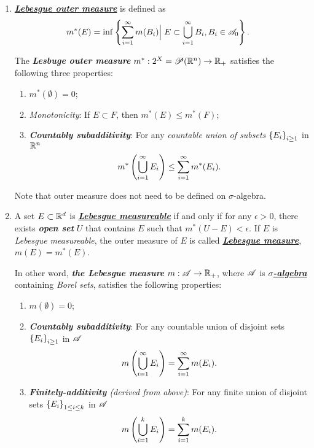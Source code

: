 \documentclass[11pt]{article}
\begin{document}
\begin{enumerate}
\item \underline{\emph{\textbf{Lebesgue outer measure}}} is defined as 
\begin{align*}
m^{*}(E) &= \inf\left\{ \sum_{i=1}^{\infty}m(B_{i})\Big|\;  E\subset \bigcup_{i=1}^{\infty}B_{i}, B_{i}\in {\mathscr A}_{0}\right\}.
\end{align*}

The \emph{\textbf{Lesbuge outer measure}} $m^{*}: 2^{X}={\mathscr P}({\mathbb R}^{n}) \rightarrow {\mathbb R}_{+}$ satisfies the following three properties:
\begin{enumerate}
\item $m^{*}(\emptyset) = 0$;
\item \emph{Monotonicity}: If $E\subset F$, then $m^{*}(E) \le m^{*}(F)$;
\item \emph{\textbf{Countably subadditivity}}:  For any \emph{countable union of subsets} $\left\{E_{i}\right\}_{i\ge 1}$ in ${\mathbb R}^{n}$ 
\begin{align*}
 m^{*}\left(\bigcup_{i=1}^{\infty}E_{i}\right) \le  \sum_{i=1}^{\infty}m^{*}(E_{i}).
\end{align*}
\end{enumerate} 
Note that outer measure does not need to be defined on $\sigma$-algebra. 


\item A set $E\subset {\mathbb R}^{d}$ is \underline{\emph{\textbf{Lebesgue measureable}}} if and only if for any $\epsilon>0$, there exists \emph{\textbf{open set}} $U$ that contains $E$ such that  $m^{*}(U-E)< \epsilon$. If $E$ is \emph{Lebesgue measureable}, the outer measure of $E$ is called \underline{\emph{\textbf{Lebesgue measure}}}, $m(E)= m^{*}(E)$.

 In other word, \emph{\textbf{the Lebesgue measure}} $m: {\mathscr A} \rightarrow {\mathbb R}_{+}$, where ${\mathscr A}$ is \underline{\emph{\textbf{$\sigma$-algebra}}} containing \emph{Borel sets},  satisfies the following properties:
\begin{enumerate}
\item $m(\emptyset) = 0$;
\item \emph{\textbf{Countably subadditivity}}:  For any countable union of disjoint sets $\left\{E_{i}\right\}_{i\ge 1}$ in ${\mathscr A}$ 
\begin{align*}
 m\left(\bigcup_{i=1}^{\infty}E_{i}\right) =  \sum_{i=1}^{\infty}m(E_{i}).
\end{align*}
\item \emph{\textbf{Finitely-additivity} (derived from above)}: For any finite union of disjoint sets $\left\{E_{i}\right\}_{1\le i \le k}$ in ${\mathscr A}$ 
\begin{align*}
 m\left(\bigcup_{i=1}^{k}E_{i}\right) =  \sum_{i=1}^{k}m(E_{i}).
\end{align*}
\end{enumerate} 


\end{enumerate}
\end{document}
